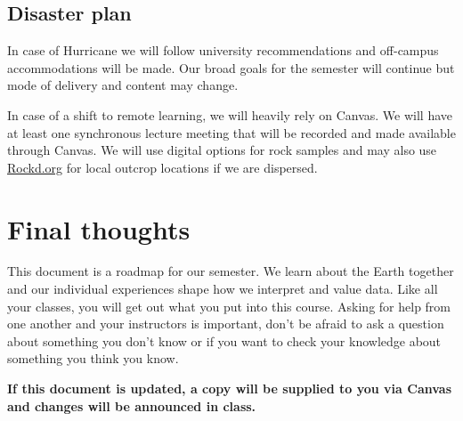 \documentclass[11pt,]{article}
\begin{document}
\hypertarget{disaster-plan}{%
\subsection{Disaster plan}\label{disaster-plan}}

In case of Hurricane we will follow university recommendations and
off-campus accommodations will be made. Our broad goals for the semester
will continue but mode of delivery and content may change.

In case of a shift to remote learning, we will heavily rely on Canvas.
We will have at least one synchronous lecture meeting that will be
recorded and made available through Canvas. We will use digital options
for rock samples and may also use \href{https://rockd.org/}{Rockd.org}
for local outcrop locations if we are dispersed.

\hypertarget{final-thoughts}{%
\section{Final thoughts}\label{final-thoughts}}

This document is a roadmap for our semester. We learn about the Earth
together and our individual experiences shape how we interpret and value
data. Like all your classes, you will get out what you put into this
course. Asking for help from one another and your instructors is
important, don't be afraid to ask a question about something you don't
know or if you want to check your knowledge about something you think
you know.

\textbf{If this document is updated, a copy will be supplied to you via
Canvas and changes will be announced in class.}
\end{document}
